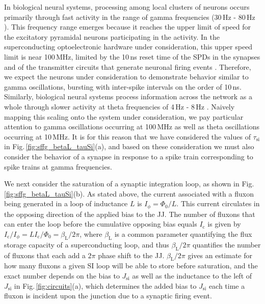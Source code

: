 \documentclass[twocolumn]{article}
\begin{document}
In biological neural systems, processing among local clusters of neurons occurs primarily through fast activity in the range of gamma frequencies (30\,Hz - 80\,Hz \cite{budr2004,bu2006}). This frequency range emerges because it reaches the upper limit of speed for the excitatory pyramidal neurons participating in the activity. In the superconducting optoelectronic hardware under consideration, this upper speed limit is near 100\,MHz, limited by the 10\,ns reset time of the SPDs in the synapses and of the transmitter circuits that generate neuronal firing events \cite{sh2018_full}. Therefore, we expect the neurons under consideration to demonstrate behavior similar to gamma oscillations, bursting with inter-spike intervals on the order of 10\,ns. Similarly, biological neural systems process information across the network as a whole through slower activity at theta frequencies of 4\,Hz - 8\,Hz \cite{budr2004,bu2006}. Naively mapping this scaling onto the system under consideration, we pay particular attention to gamma oscillations occurring at 100\,MHz as well as theta oscillations occurring at 10\,MHz. It is for this reason that we have considered the values of $\tau_{\mathrm{si}}$ in Fig.\,\ref{fig:sffg_betaL_tauSi}(a), and based on these consideration we must also consider the behavior of a synapse in response to a spike train corresponding to spike trains at gamma frequencies. 

We next consider the saturation of a synaptic integration loop, as shown in Fig.\,\ref{fig:sffg_betaL_tauSi}(b). As stated above, the current associated with a fluxon being generated in a loop of inductance $L$ is $I_{\phi} = \Phi_0/L$. This current circulates in the opposing direction of the applied bias to the JJ. The number of fluxons that can enter the loop before the cumulative opposing bias equals $I_{\mathrm{c}}$ is given by $I_{\mathrm{c}}/I_{\phi} = L I_{\mathrm{c}}/\Phi_0 = \beta_{\mathrm{L}}/2 \pi$, where $\beta_{\mathrm{L}}$ is a common parameter quantifying the flux storage capacity of a superconducting loop, and thus $\beta_{\mathrm{L}}/2\pi$ quantifies the number of fluxons that each add a $2\pi$ phase shift to the JJ. $\beta_{\mathrm{L}}/2\pi$ gives an estimate for how many fluxons a given SI loop will be able to store before saturation, and the exact number depends on the bias to $J_{\mathrm{si}}$ as well as the inductance to the left of $J_{\mathrm{si}}$ in Fig.\,\ref{fig:circuits}(a), which determines the added bias to $J_{\mathrm{si}}$ each time a fluxon is incident upon the junction due to a synaptic firing event. 
\end{document}
